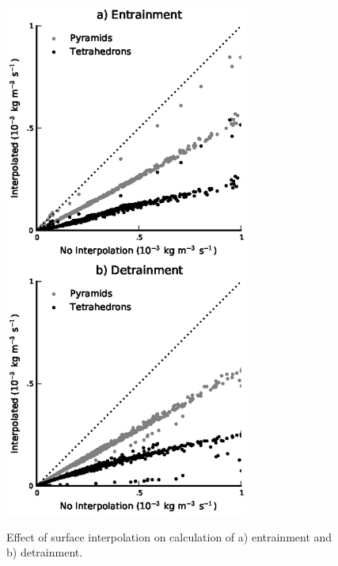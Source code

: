 \documentclass[12pt]{article}
\begin{document}
\begin{figure}[t]
  \noindent\includegraphics[width=19pc,angle=0]{./figures/effect_of_interpolation.eps}\\
  \caption{Effect of surface interpolation on calculation of a) entrainment and 
b) detrainment.}\label{fig:effect_of_interpolation}
\end{figure}
\end{document}
